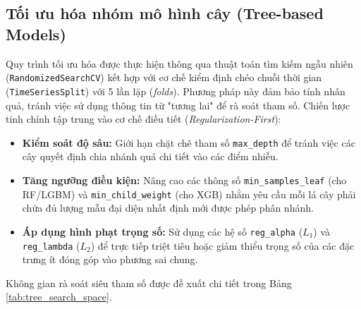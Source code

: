 \subsection{Tối ưu hóa nhóm mô hình cây (Tree-based Models)}
Quy trình tối ưu hóa được thực hiện thông qua thuật toán tìm kiếm ngẫu nhiên (\texttt{RandomizedSearchCV}) kết hợp với cơ chế kiểm định chéo chuỗi thời gian (\texttt{TimeSeriesSplit}) với 5 lần lặp (\textit{folds}). Phương pháp này đảm bảo tính nhân quả, tránh việc sử dụng thông tin từ "tương lai" để rà soát tham số.
Chiến lược tinh chỉnh tập trung vào cơ chế điều tiết (\textit{Regularization-First}):
\begin{itemize}
    \item \textbf{Kiểm soát độ sâu:} Giới hạn chặt chẽ tham số \texttt{max\_depth} để tránh việc các cây quyết định chia nhánh quá chi tiết vào các điểm nhiễu.
    \item \textbf{Tăng ngưỡng điều kiện:} Nâng cao các thông số \texttt{min\_samples\_leaf} (cho RF/LGBM) và \texttt{min\_child\_weight} (cho XGB) nhằm yêu cầu mỗi lá cây phải chứa đủ lượng mẫu đại diện nhất định mới được phép phân nhánh.
    \item \textbf{Áp dụng hình phạt trọng số:} Sử dụng các hệ số \texttt{reg\_alpha} ($L_1$) và \texttt{reg\_lambda} ($L_2$) để trực tiếp triệt tiêu hoặc giảm thiểu trọng số của các đặc trưng ít đóng góp vào phương sai chung.
\end{itemize}
Không gian rà soát siêu tham số được đề xuất chi tiết trong Bảng \ref{tab:tree_search_space}.

